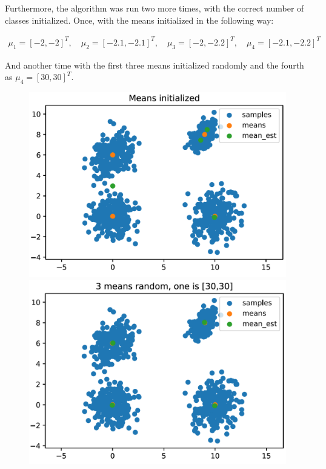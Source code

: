 \documentclass[DIV=12, ngerman, fontsize=12pt, parskip=half]{scrreprt}
\begin{document}
\begin{figure}[H]
\begin{center}
\begin{minipage}[b]{0.4\textwidth}
		\end{minipage}
	\end{center}
	\end{figure}

	Furthermore, the algorithm was run two more times, with the correct number of classes initialized. Once, with the means initialized in the following way:

	\begin{align*}
		\mu_1 = [-2,-2]^T, \quad \mu_2 = [-2.1,-2.1]^T, \quad \mu_3 = [-2,-2.2]^T, \quad \mu_4 = [-2.1,-2.2]^T
	\end{align*}

	And another time with the first three means initialized randomly and the fourth as $\mu_4 = [30,30]^T$. 
	
	\begin{figure}[H]
		\begin{minipage}[t]{0.5\textwidth}
			\includegraphics[width=\textwidth]{Task3_means_init4_png}
		\end{minipage}
		\begin{minipage}[t]{0.5\textwidth}
			\includegraphics[width=\textwidth]{Task3_means_init1_png}
		\end{minipage}
	\end{figure}
\end{document}
